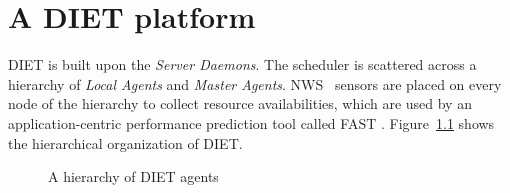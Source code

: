 
\chapter{A DIET platform}
\label{ch:description}

DIET is built upon the \emph{Server Daemons}. The scheduler is
scattered across a hierarchy of \emph{Local Agents} and \emph{Master
  Agents}. NWS~\cite{WSH99} sensors are placed on every node of the
hierarchy to collect resource availabilities, which are used by an
application-centric performance prediction tool called FAST
\cite{Qui02}.  Figure~\ref{fig:platform} shows the hierarchical
organization of DIET.

\begin{figure}[htb]
 \begin{center}
  \label{fig:platform}
  \caption{A hierarchy of DIET agents}
 \end{center}
\end{figure}

